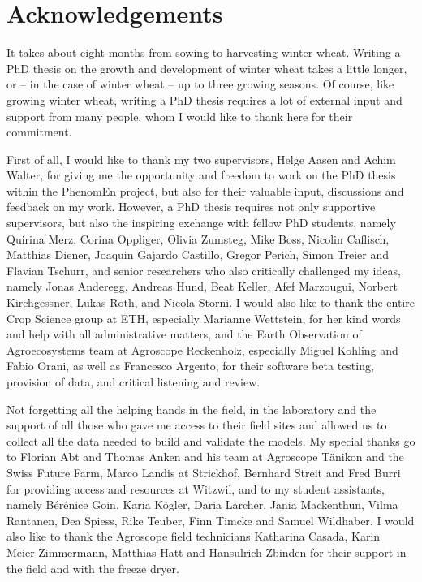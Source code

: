 \chapter*{Acknowledgements}
\renewcommand{\sectionmark}[1]{ \markright{ \MakeUppercase{#1} } }

It takes about eight months from sowing to harvesting winter wheat. Writing a PhD thesis on the growth and development of winter wheat takes a little longer, or -- in the case of winter wheat -- up to three growing seasons. Of course, like growing winter wheat, writing a PhD thesis requires a lot of external input and support from many people, whom I would like to thank here for their commitment.

First of all, I would like to thank my two supervisors, Helge Aasen and Achim Walter, for giving me the opportunity and freedom to work on the PhD thesis within the PhenomEn project, but also for their valuable input, discussions and feedback on my work. However, a PhD thesis requires not only supportive supervisors, but also the inspiring exchange with fellow PhD students, namely Quirina Merz, Corina Oppliger, Olivia Zumsteg, Mike Boss, Nicolin Caflisch, Matthias Diener, Joaquin Gajardo Castillo, Gregor Perich, Simon Treier and Flavian Tschurr, and senior researchers who also critically challenged my ideas, namely Jonas Anderegg, Andreas Hund, Beat Keller, Afef Marzougui, Norbert Kirchgessner, Lukas Roth, and Nicola Storni. I would also like to thank the entire Crop Science group at ETH, especially Marianne Wettstein, for her kind words and help with all administrative matters, and the Earth Observation of Agroecosystems team at Agroscope Reckenholz, especially Miguel Kohling and Fabio Orani, as well as Francesco Argento, for their software beta testing, provision of data, and critical listening and review.

Not forgetting all the helping hands in the field, in the laboratory and the support of all those who gave me access to their field sites and allowed us to collect all the data needed to build and validate the models. My special thanks go to Florian Abt and Thomas Anken and his team at Agroscope Tänikon and the Swiss Future Farm, Marco Landis at Strickhof, Bernhard Streit and Fred Burri for providing access and resources at Witzwil, and to my student assistants, namely Bérénice Goin, Karia Kögler, Daria Larcher, Jania Mackenthun, Vilma Rantanen, Dea Spiess, Rike Teuber, Finn Timcke and Samuel Wildhaber. I would also like to thank the Agroscope field technicians Katharina Casada, Karin Meier-Zimmermann, Matthias Hatt and Hansulrich Zbinden for their support in the field and with the freeze dryer.

